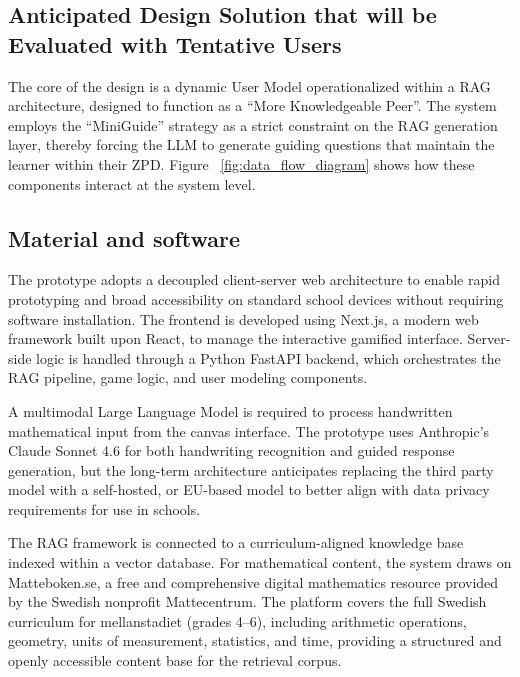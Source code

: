\subsection{Anticipated Design Solution that will be Evaluated with Tentative Users}


The core of the design is a dynamic User Model operationalized within a RAG architecture, designed to function as a \enquote{More Knowledgeable Peer}. The system employs the \enquote{MiniGuide} strategy as a strict constraint on the RAG generation layer, thereby forcing the LLM to generate guiding questions that maintain the learner within their ZPD. Figure ~\ref{fig:data_flow_diagram} shows how these components interact at the system level.





\subsection{Material and software}


The prototype adopts a decoupled client-server web architecture to enable rapid prototyping and broad accessibility on standard school devices without requiring software installation. The frontend is developed using Next.js, a modern web framework built upon React, to manage the interactive gamified interface. Server-side logic is handled through a Python FastAPI backend, which orchestrates the RAG pipeline, game logic, and user modeling components.

A multimodal Large Language Model is required to process handwritten mathematical input from the canvas interface. The prototype uses Anthropic's Claude Sonnet 4.6 for both handwriting recognition and guided response generation, but the long-term architecture anticipates replacing the third party model with a self-hosted, or EU-based model to better align with data privacy requirements for use in schools.

The RAG framework is connected to a curriculum-aligned knowledge base indexed within a vector database. For mathematical content, the system draws on Matteboken.se, a free and comprehensive digital mathematics resource provided by the Swedish nonprofit Mattecentrum. The platform covers the full Swedish curriculum for mellanstadiet (grades 4--6), including arithmetic operations, geometry, units of measurement, statistics, and time, providing a structured and openly accessible content base for the retrieval corpus.

